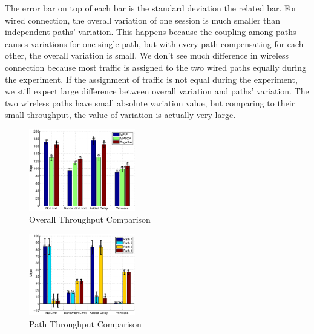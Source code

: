 The error bar on top of each bar is the standard deviation the related bar. For wired connection, the overall variation of one session is much smaller than independent paths' variation. This happens because the coupling among paths causes variations for one single path, but with every path compensating for each other, the overall variation is small. We don't see much difference in wireless connection because most traffic is assigned to the two wired paths equally during the experiment. If the assignment of traffic is not equal during the experiment, we still expect large difference between overall variation and paths' variation. The two wireless paths have small absolute variation value, but comparing to their small throughput, the value of variation is actually very large.

\begin{figure}[htb]
\centering
\includegraphics[width=0.8\linewidth,height=1.4in]{fig/tp_bar.eps}
\caption{Overall Throughput Comparison}
\label{fig.tp_bar}
\end{figure}

\begin{figure}[htb]
\centering
\includegraphics[width=0.8\linewidth,height=1.4in]{fig/path_tp_bar.eps}
\caption{Path Throughput Comparison}
\label{fig.path_tp_bar}
\end{figure}




